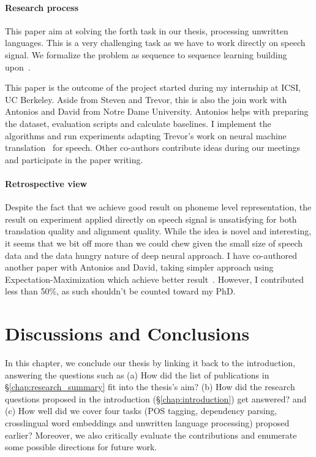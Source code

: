\documentclass[12pt,twoside,final,hidelinks]{ltthesis}
\theoremstyle{definition}
\begin{document}
\subsubsection{Research process}
This paper aim at solving the forth task in our thesis, processing unwritten languages. This is a very challenging task as we have to work directly on speech 
signal. We formalize the problem as sequence to sequence learning building upon~. 

This paper is the outcome of the project started during my internship at ICSI, UC Berkeley. Aside from Steven and Trevor, this is also the join work with Antonios and David from Notre Dame University. Antonios helps with preparing the dataset, evaluation scripts and calculate baselines. I implement the algorithms and run experiments adapting Trevor's work on neural machine translation~\cite{cohn-EtAl:2016:N16-1} for speech. Other co-authors contribute ideas during our meetings and participate in the paper writing. 

\subsubsection{Retrospective view}
Despite the fact that we achieve good result on phoneme level representation, the result on experiment applied directly on speech signal is unsatisfying for both 
translation quality and alignment quality. While the idea is novel and interesting, it seems that we bit off more than we could chew given the small size of speech 
data and the data hungry nature of deep neural approach. I have co-authored another paper with Antonios and David, taking simpler approach using Expectation-Maximization which achieve better result~\cite{anastasopoulos-chiang-duong:2016:EMNLP2016}. However, I contributed less than 50\%, as such shouldn't be counted toward my PhD.




\chapter{Discussions and Conclusions}
\label{chap:conclusion}
In this chapter, we conclude our thesis by linking it back to the introduction, answering the questions such as (a) How did the list of publications in \S\ref{chap:research_summary} fit into the thesis's aim? (b) How did the research questions proposed in the introduction (\S\ref{chap:introduction}) get 
answered? and (c) How well did we cover four tasks (POS tagging, dependency parsing, crosslingual word embeddings and unwritten language processing) proposed earlier? Moreover, we also critically evaluate the contributions and enumerate some possible directions
for future work. 
\end{document}
